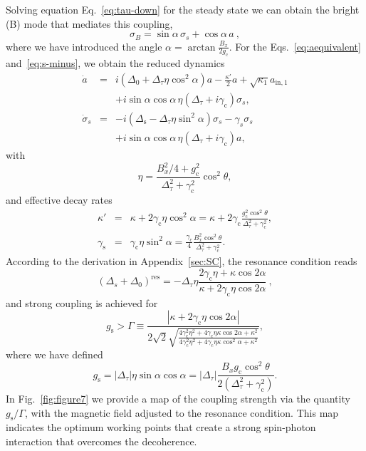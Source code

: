 \documentclass[twocolumn,english,aps,prl,preprint,reprint,showpacs,longbibliography,showkeys]{revtex4-1}
\begin{document}
Solving equation Eq.~\eqref{eq:tau-down} for the steady state we can obtain the bright (B) mode that mediates this coupling, 
\begin{equation}
\sigma_{B}=\sin\alpha\,\sigma_{s} 
+ \cos{\alpha}\, a\ ,
\end{equation}
where we have introduced the angle $\alpha=\arctan\frac{B_x}{2g_{\mathrm{c}}}$.
For the Eqs.~\eqref{eq:aequivalent} and~\eqref{eq:s-minus}, we obtain 
the reduced dynamics 
\begin{eqnarray}
\dot{a}  &=&i (\Delta_0+\Delta_{\tau}\eta\cos^2\alpha) a-\frac{\kappa'}{2}  a+\sqrt{\kappa_1} a_{\mathrm{in},1} \nonumber\\
&&+i \sin\alpha\cos\alpha\,\eta(\Delta_{\tau}+i\gamma_{\mathrm{c}}) \sigma_{s}, \label{eq:areduced}\\
\dot{\sigma}_{s}  &=&-i( \Delta_{\mathrm{s}}-\Delta_{\tau}\eta\sin^2\alpha)\sigma_{s}-\gamma_s\sigma_{s} \nonumber\\ 
&&+i \sin\alpha\cos\alpha\,\eta(\Delta_{\tau}+i\gamma_{\mathrm{c}}) a
 , \label{eq:s-minusreduced}
\end{eqnarray} 
with
\begin{equation}
\eta=\frac{B_x^2/4+g_{\mathrm{c}}^2}{\Delta_{\tau}^2+\gamma_{\mathrm{c}}^2}\cos^2\theta ,
\end{equation}
and  effective decay rates  
\begin{eqnarray}
\kappa'& =&\kappa+2\gamma_{\mathrm{c}}\eta\cos^2\alpha=\kappa+2\gamma_{\mathrm{c}}\frac{g^2_{\mathrm{c}}\cos^2\theta}{\Delta_{\tau}^2+\gamma_{\mathrm{c}}^2},\\
\gamma_{\mathrm{s}} &=&\gamma_{\mathrm{c}}\eta\sin^2\alpha=\frac{\gamma_{\mathrm{c}}}{4}\frac{B_x^2\cos^2\theta}{\Delta_{\tau}^2+\gamma_{\mathrm{c}}^2}. 
\end{eqnarray}
According to the derivation in Appendix~\ref{sec:SC},
the resonance condition reads
\begin{equation}
(\Delta_s+\Delta_0)^{\mathrm{res}}=-\Delta_{\tau}\eta\frac{2\gamma_{\mathrm{c}}\eta+\kappa \cos{2\alpha}}{\kappa+2\gamma_{\mathrm{c}}\eta \cos{2\alpha}} \ ,\label{eq:resonance-condition}
\end{equation}
and  strong coupling is achieved for
\begin{equation}
g_{\mathrm{s}}>\Gamma\equiv\frac{|\kappa+2\gamma_{\mathrm{c}}\eta \cos{2\alpha}|}{2\sqrt{2}\sqrt{\frac{4\gamma_{\mathrm{c}}^2\eta^2+4\gamma_{\mathrm{c}}\eta\kappa\cos{2\alpha}+\kappa^2}{4\gamma_{\mathrm{c}}^2\eta^2+4\gamma_{\mathrm{c}}\eta\kappa\cos^2{\alpha}+\kappa^2}}} , \label{eq:SC-condition}
\end{equation}
where we have defined
\begin{equation}
g_{\mathrm{s}}=|\Delta_{\tau}|\eta\sin\alpha\cos\alpha=|\Delta_{\tau}|\frac{B_x g_{\mathrm{c}}\cos^2{\theta}}{2(\Delta_{\tau}^2+\gamma_{\mathrm{c}}^2)}.
\end{equation}
In Fig.~\ref{fig:figure7} we provide  a map of the coupling strength via the quantity $g_{\mathrm{s}}/\Gamma$, with the magnetic field  adjusted to the resonance condition.
This map  indicates the optimum working points that create a strong spin-photon interaction that overcomes the decoherence.
\end{document}
